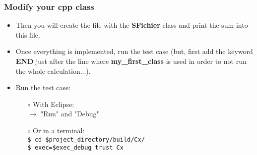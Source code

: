 \documentclass[10pt, hyperref={unicode=true,pdfusetitle, bookmarks=true,bookmarksnumbered=false,bookmarksopen=false, breaklinks=false,pdfborder={0 0 1},backref=true,colorlinks=true,linkcolor=darkblue,pageanchor, urlcolor=darkblue}]{beamer}
\begin{document}
\begin{frame}
\frametitle{Modify your cpp class}
\begin{block}{}

\begin{itemize}
\item Then you will create the file with the \textbf{SFichier} class and print the sum into this file.

\item Once everything is implemented, run the test case (but, first add the keyword \textbf{END} just after the line where \textbf{my\_first\_class} is used in order to not run the whole calculation...).\\
\end{itemize}

\begin{itemize}
\item Run the test case:\\
    \begin{itemize}
    \item [$\circ$] With Eclipse:\\
    $\rightarrow$ "Run" and "Debug"\\
    \item [$\circ$] Or in a terminal:\\
    \texttt{\$ cd \$project\_directory/build/Cx/}\\
    \texttt{\$ exec=\$exec\_debug trust Cx}
    \end{itemize}
\end{itemize}

\end{block}
\end{frame}
\end{document}
